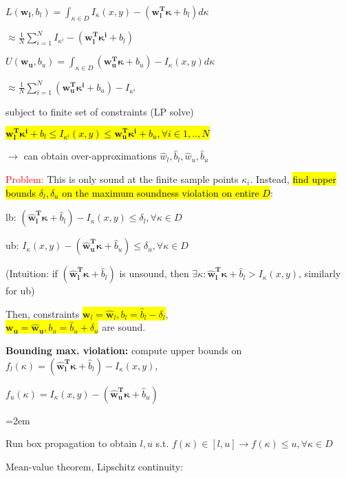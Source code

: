\documentclass[11pt,landscape,a4paper,fleqn]{article}
\newcommand{\mhl}[1]{\setlength{\fboxsep}{0pt}\colorbox{yellow}{#1}}
\begin{document}
\begin{multicols*}{4}
$L(\mathbf{w_l}, b_l) = \int_{\kappa \in D} I_\kappa(x,y) - (\mathbf{w_l^T \kappa} + b_l) d\kappa$

\hspace*{14mm}$\approx \frac{1}{N} \sum_{i=1}^{N} I_{\kappa^i} - (\mathbf{w_l^T \kappa^i} + b_l)$

$U(\mathbf{w_u}, b_u) = \int_{\kappa \in D} (\mathbf{w_u^T \kappa} + b_u) - I_\kappa(x,y) d\kappa$

\hspace*{16mm}$\approx \frac{1}{N} \sum_{i=1}^{N} (\mathbf{w_u^T \kappa^i} + b_u) - I_{\kappa^i}$

subject to finite set of constraints (LP solve)

\hl{$\mathbf{w_l^T \kappa^i} + b_l \leq I_{\kappa^i}(x,y) \leq \mathbf{w_u^T \kappa^i} + b_u, \forall i \in {1,..,N}$}

$\rightarrow$ can obtain over-approximations $\hat{w}_l, \hat{b}_l, \hat{w}_u, \hat{b}_u$

\textcolor{red}{Problem:} This is only sound at the finite sample points $\kappa_i$. Instead, \hl{find upper bounds $\delta_l, \delta_u$ on the maximum soundness violation on entire $D$}:

lb: $(\mathbf{\hat{w}_l^T \kappa} + \hat{b}_l) - I_\kappa(x,y) \leq \delta_l, \forall \kappa \in D$

ub: $I_\kappa(x,y) - (\mathbf{\hat{w}_u^T \kappa} + \hat{b}_u) \leq \delta_u, \forall \kappa \in D$

(Intuition: if $(\mathbf{\hat{w}_l^T \kappa} + \hat{b}_l)$ is unsound, then $\exists \kappa: \mathbf{\hat{w}_l^T \kappa} + \hat{b}_l > I_\kappa(x,y)$, similarly for ub)

Then, constraints \mhl{$\mathbf{w}_l = \mathbf{\hat{w}}_l, b_l = \hat{b}_l - \delta_l$},\\
\mhl{$\mathbf{w_u} = \mathbf{\hat{w}_u}, b_u = \hat{b}_u + \delta_u$} are sound.


\textbf{Bounding max. violation:} compute upper bounds on $f_l(\kappa) = (\mathbf{\hat{w}_l^T \kappa} + \hat{b}_l) - I_\kappa(x,y)$,

$f_u(\kappa) = I_\kappa(x,y) - (\mathbf{\hat{w}_u^T \kappa} + \hat{b}_u)$

\begin{compactitem}=2em
\item Run box propagation to obtain $l,u$ s.t. $f(\kappa) \in [l,u] \rightarrow f(\kappa) \leq u, \forall \kappa \in D$

\item Mean-value theorem, Lipschitz continuity:


\end{compactitem}
\end{multicols*}
\end{document}
